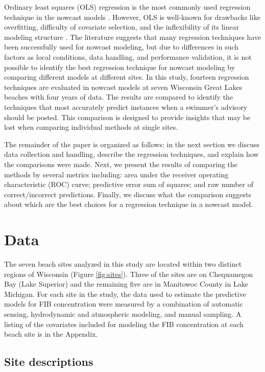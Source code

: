 \documentclass[authoryear,review, 12pt]{elsarticle}
\begin{document}
Ordinary least squares (OLS) regression is the most commonly used
regression technique in the nowcast models
\citep{deBrauwere-Koffi-Servais-2014}. However, OLS is well-known for
drawbacks like overfitting, difficulty of covariate selection, and the
inflexibility of its linear modeling structure \citep{Ge:2007ou}. The
literature suggests that many regression techniques have been
successfully used for nowcast modeling, but due to differences in such
factors as local conditions, data handling, and performance validation,
it is not possible to identify the best regression technique for nowcast
modeling by comparing different models at different sites. In this
study, fourteen regression techniques are evaluated in nowcast models at
seven Wisconsin Great Lakes beaches with four years of data. The results
are compared to identify the techniques that most accurately predict
instances when a swimmer's advisory should be posted. This comparison is
designed to provide insights that may be lost when comparing individual
methods at single sites.

The remainder of the paper is organized as follows: in the next section
we discuss data collection and handling, describe the regression
techniques, and explain how the comparisons were made. Next, we present
the results of comparing the methods by several metrics including: area
under the receiver operating characteristic (ROC) curve; predictive
error sum of squares; and raw number of correct/incorrect predictions.
Finally, we discuss what the comparison suggests about which are the
best choices for a regression technique in a nowcast model.

\section{Data}\label{data}

The seven beach sites analyzed in this study are located within two
distinct regions of Wisconsin (Figure \ref{fig:sites}). Three of the
sites are on Chequamegon Bay (Lake Superior) and the remaining five are
in Manitowoc County in Lake Michigan. For each site in the study, the
data used to estimate the predictive models for FIB concentration were
measured by a combination of automatic sensing, hydrodynamic and
atmospheric modeling, and manual sampling. A listing of the covariates
included for modeling the FIB concentration at each beach site is in the
Appendix.

\subsection{Site descriptions}\label{site-descriptions}
\end{document}
